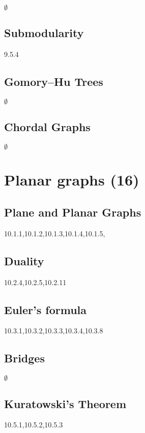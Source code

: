 \documentclass[12pt]{article}
\begin{document}
$\emptyset$

\subsection{Submodularity}

9.5.4

\subsection{Gomory–Hu Trees}

$\emptyset$

\subsection{Chordal Graphs}

$\emptyset$

\newpage


\section{Planar graphs (16)}


\subsection{Plane and Planar Graphs}

10.1.1,10.1.2,10.1.3,10.1.4,10.1.5,

\subsection{Duality}

10.2.4,10.2.5,10.2.11

\subsection{Euler's formula}

10.3.1,10.3.2,10.3.3,10.3.4,10.3.8

\subsection{Bridges}

$\emptyset$

\subsection{Kuratowski’s Theorem}

10.5.1,10.5.2,10.5.3
\end{document}

